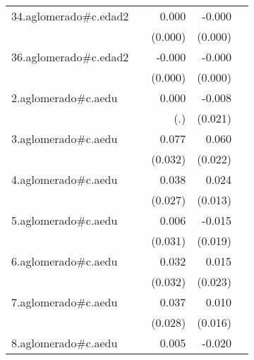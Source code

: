 {\begin{longtable}{l*{4}{D{.}{.}{-1}}}
\addlinespace
34.aglomerado#c.edad2&                     &       0.000         &      -0.000\sym{**} &                     \\
            &                     &     (0.000)         &     (0.000)         &                     \\
\addlinespace
36.aglomerado#c.edad2&                     &      -0.000         &      -0.000\sym{**} &                     \\
            &                     &     (0.000)         &     (0.000)         &                     \\
\addlinespace
2.aglomerado#c.aedu&                     &       0.000         &      -0.008         &                     \\
            &                     &         (.)         &     (0.021)         &                     \\
\addlinespace
3.aglomerado#c.aedu&                     &       0.077\sym{*}  &       0.060\sym{**} &                     \\
            &                     &     (0.032)         &     (0.022)         &                     \\
\addlinespace
4.aglomerado#c.aedu&                     &       0.038         &       0.024         &                     \\
            &                     &     (0.027)         &     (0.013)         &                     \\
\addlinespace
5.aglomerado#c.aedu&                     &       0.006         &      -0.015         &                     \\
            &                     &     (0.031)         &     (0.019)         &                     \\
\addlinespace
6.aglomerado#c.aedu&                     &       0.032         &       0.015         &                     \\
            &                     &     (0.032)         &     (0.023)         &                     \\
\addlinespace
7.aglomerado#c.aedu&                     &       0.037         &       0.010         &                     \\
            &                     &     (0.028)         &     (0.016)         &                     \\
\addlinespace
8.aglomerado#c.aedu&                     &       0.005         &      -0.020         &                     \\

\end{longtable}}
